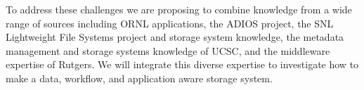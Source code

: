 To address these challenges we are proposing to combine knowledge
from a wide range of sources including ORNL applications, the ADIOS project,
the SNL Lightweight File Systems project and storage system knowledge, the metadata
management and storage systems knowledge of UCSC, and the middleware expertise
of Rutgers. We will integrate this diverse expertise to investigate how to make
a data, workflow, and application aware storage system.


